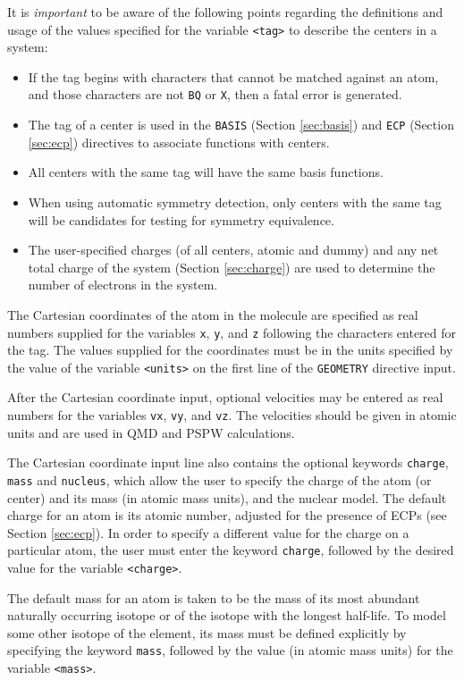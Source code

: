 It is {\em important} to be aware of the following points regarding
the definitions and usage of the values specified for the variable
\verb+<tag>+ to describe the centers in a system:
\begin{itemize}
\item If the tag begins with characters that cannot be matched against
  an atom, and those characters are not \verb+BQ+ or \verb+X+, then a
  fatal error is generated.
\item The tag of a center is used in the \verb+BASIS+ (Section
  \ref{sec:basis}) and \verb+ECP+ (Section \ref{sec:ecp}) directives
  to associate functions with centers.
\item All centers with the same tag will have the same basis
  functions.
\item When using automatic symmetry detection,
  only centers with the same tag will be candidates for testing for
  symmetry equivalence.
\item The user-specified charges (of all centers, atomic and dummy)
  and any net total charge of the system (Section \ref{sec:charge})
  are used to determine the number of electrons in the system.
\end{itemize}

The Cartesian coordinates of the atom in the molecule are specified as
real numbers supplied for the variables \verb+x+, \verb+y+, and
\verb+z+ following the characters entered for the tag.  The values
supplied for the coordinates must be in the units specified by the
value of the variable \verb+<units>+ on the first line of the
\verb+GEOMETRY+ directive input.

After the Cartesian coordinate input, optional velocities may be 
entered as real numbers for the variables \verb+vx+, \verb+vy+, and 
\verb+vz+.  The velocities should be given in atomic units and are 
used in QMD and PSPW calculations.

The Cartesian coordinate input line also contains the optional keywords
\verb+charge+, \verb+mass+ and \verb+nucleus+, which allow the user to
specify the charge of the atom (or center) and its mass (in atomic mass
units), and the nuclear model.  The default charge for an atom is
its atomic number, adjusted for the presence of ECPs (see Section
\ref{sec:ecp}).  In order to specify a different value for the charge on a
particular atom, the user must enter the keyword \verb+charge+, followed by
the desired value for the variable \verb+<charge>+.

The default mass for an atom is taken to be the mass of its most abundant
naturally occurring isotope or of the isotope with the longest half-life.
To model some other isotope of the element, its mass must be defined
explicitly by specifying the keyword \verb+mass+, followed by the value (in
atomic mass units) for the variable \verb+<mass>+.

